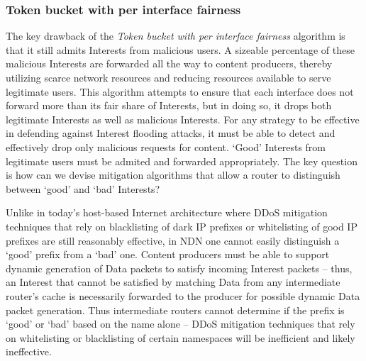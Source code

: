 


\subsubsection{\textbf{Token bucket with per interface fairness}}
\label{sec:queuing}





The key drawback of the {\it Token bucket with per interface fairness} algorithm is that it still admits Interests from malicious users. A sizeable percentage of these malicious Interests are forwarded all the way to content producers, thereby utilizing scarce network resources and reducing resources available to serve legitimate users.  This algorithm attempts to ensure that each interface does not forward more than its fair share of Interests, but in doing so, it drops both legitimate Interests as well as malicious Interests. For any strategy to be effective in defending against Interest flooding attacks, it must be able to detect and effectively drop only malicious requests for content. `Good' Interests from legitimate users must be admited and forwarded appropriately. The key question is how can we devise mitigation algorithms that allow a router to distinguish between `good' and `bad' Interests? 

Unlike in today's host-based Internet architecture where DDoS mitigation techniques that rely on blacklisting of dark IP prefixes or whitelisting of good IP prefixes are still reasonably effective, in NDN one cannot easily distinguish a `good' prefix from a `bad' one. Content producers must be able to support dynamic generation of Data packets to satisfy incoming Interest packets -- thus, an Interest that cannot be satisfied by matching Data from any intermediate router's cache is necessarily forwarded to the producer for possible dynamic Data packet generation. Thus intermediate routers cannot determine if the prefix is `good' or `bad' based on the name alone -- DDoS mitigation techniques that rely on whitelisting or blacklisting of certain namespaces  will be inefficient and likely ineffective. 

